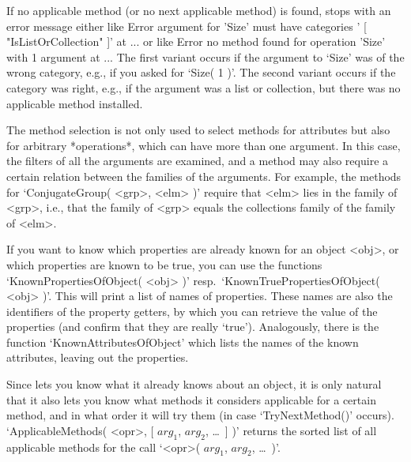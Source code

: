 If no applicable method  (or no next applicable  method) is found, {\GAP}
stops with an error message either like
\begintt
    Error argument for 'Size' must have categories '
    [ "IsListOrCollection" ]' at ...
\endtt
or like
\begintt
    Error no method found for operation 'Size' with 1 argument at ...
\endtt
The  first variant occurs  if  the argument  to  `Size' was  of the wrong
category, e.g.,  if you asked for `Size(  1 )'. The second variant occurs
if the category was    right,  e.g., if   the  argument  was a list    or
collection, but there was no applicable method installed.

\null

%
\danger The method  selection  is not only   used to select  methods  for
attributes but also for arbitrary  *operations*, which can have more than
one   argument.  In this case,   the  filters of  all  the  arguments are
examined, and a  method may also  require a certain  relation between the
families of the arguments. For example,  the methods for `ConjugateGroup(
<grp>, <elm> )'  require that <elm> lies  in the  family of <grp>,  i.e.,
that the family of  <grp> equals the  collections family of the family of
<elm>.

%
%
If  you want  to know  which properties are  already  known for an object
<obj>, or  which properties   are known to    be true, you can    use the
functions       `KnownPropertiesOfObject(         <obj>       )'   resp.\
`KnownTruePropertiesOfObject( <obj> )'. This will  print a list of  names
of  properties. These names   are also the  identifiers  of  the property
getters,  by which  you can retrieve  the value   of  the properties (and
confirm that they are really `true'). Analogously,  there is the function
`KnownAttributesOfObject' which lists  the names of the known attributes,
leaving out the properties.

%
\danger Since {\GAP} lets you know what it already knows about an object,
it is only natural that  it also lets you  know what methods it considers
applicable for a certain method,  and in what order  it will try them (in
case  `TryNextMethod()'  occurs).  `ApplicableMethods( <opr>,  [ $arg_1$,
$arg_2$, \dots\  ] )' returns the  sorted list  of all applicable methods
for the call `<opr>( $arg_1$, $arg_2$, \dots\ )'.

